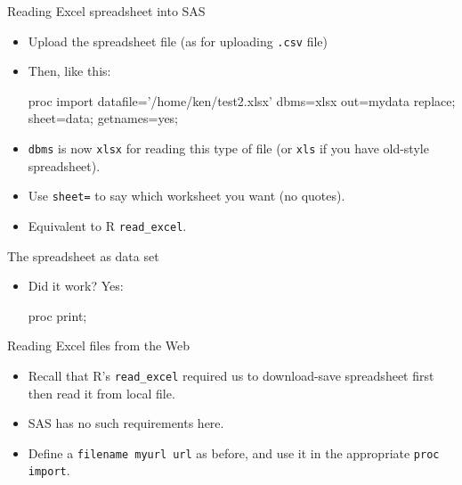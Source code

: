 \documentclass[unknownkeysallowed]{beamer}\usepackage[]{graphicx}\usepackage[]{color}
\begin{document}
\begin{frame}[fragile]{Reading Excel spreadsheet into SAS}
  
  \begin{itemize}
  \item Upload the spreadsheet file (as for uploading \texttt{.csv}
    file)
  \item Then, like this:
    
    \begin{Datastep}
proc import 
  datafile='/home/ken/test2.xlsx'
  dbms=xlsx
  out=mydata
  replace;
  sheet=data;
  getnames=yes;
    \end{Datastep}
    
    
  \item \texttt{dbms} is now \texttt{xlsx} for reading this type of
    file (or \texttt{xls} if you have old-style spreadsheet).
  \item Use \texttt{sheet=} to say which worksheet you want (no quotes).
    
  \item Equivalent to R \texttt{read\_excel}.
  \end{itemize}
  
\end{frame}

\begin{frame}[fragile]{The spreadsheet as data set}

  
  \begin{itemize}
  \item Did it work? Yes:

    \begin{Sascode}[store=re]
proc print;    
  \end{Sascode}
  


  \end{itemize}
  
  
\end{frame}

\begin{frame}[fragile]{Reading Excel files from the Web}
  
  \begin{itemize}
  \item Recall that R's \texttt{read\_excel} required us to
    download-save spreadsheet first then read it from local file.
  \item SAS has no such requirements here.
  \item Define a \texttt{filename myurl url} as before, and use it in
    the appropriate \texttt{proc import}.
    
  \end{itemize}
  
\end{frame}
\end{document}
